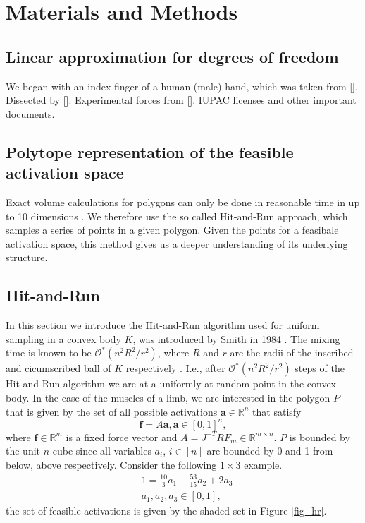 \section{Materials and Methods}






\subsection{Linear approximation for degrees of freedom}
We began with an index finger of a human (male) hand, which was taken from []. Dissected by []. Experimental forces from []. IUPAC licenses and other important documents.

\subsection{Polytope representation of the feasible activation space}
Exact volume calculations for polygons can only be done in reasonable time in up to 10 dimensions \cite{Dyer2, Khachiyan, Khachiyan2}. We therefore use the so called Hit-and-Run approach, which samples a series of points in a given polygon. Given the points for a feasibale activation space, this method gives us a deeper understanding of its underlying structure. 
\subsection{Hit-and-Run}
In this section we introduce the Hit-and-Run algorithm used for uniform sampling in a convex body $K$, was introduced by Smith in 1984 \cite{Smith}. The mixing time is known to be $\mathcal{O}^*(n^2R^2/r^2)$, where $R$ and $r$ are the radii of the inscribed and cicumscribed ball of $K$ respectively \cite{Dyer, Lovasz}. I.e., after $\mathcal{O}^*(n^2R^2/r^2)$ steps of the Hit-and-Run algorithm we are at a uniformly at random point in the convex body. 
In the case of the muscles of a limb, we are interested in the polygon $P$ that is given by the set of all possible activations $\textbf{a} \in \mathbb{R}^n$ that satisfy
\[\textbf{f} = A\textbf{a}, \textbf{a} \in [0,1]^n,\]
where $\textbf{f} \in \mathbb{R}^m$ is a fixed force vector and $A = J^{-T}RF_m \in \mathbb{R}^{m \times n}$. $P$ is bounded by the unit $n$-cube since all variables $a_i$, $i \in [n]$ are bounded by 0 and 1 from below, above respectively.
Consider the following $1 \times 3$ example.
\begin{align*}
&1 = \frac{10}{3}a_1 - \frac{53}{15}a_2 + 2a_3 \\
&a_1, a_2, a_3 \in [0,1],
\end{align*}
the set of feasible activations is given by the shaded set in Figure \ref{fig_hr}.

